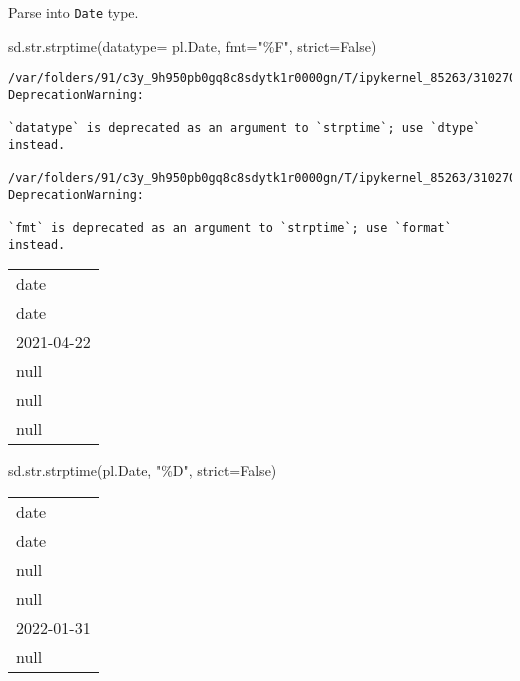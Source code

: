 \documentclass[
  letterpaper,
  DIV=11,
  numbers=noendperiod]{scrartcl}
\newenvironment{Shaded}{\begin{snugshade}}{\end{snugshade}}
\newcommand{\BuiltInTok}[1]{\textcolor[rgb]{0.00,0.23,0.31}{#1}}
\newcommand{\NormalTok}[1]{\textcolor[rgb]{0.00,0.23,0.31}{#1}}
\newcommand{\OperatorTok}[1]{\textcolor[rgb]{0.37,0.37,0.37}{#1}}
\newcommand{\SpecialCharTok}[1]{\textcolor[rgb]{0.37,0.37,0.37}{#1}}
\newcommand{\StringTok}[1]{\textcolor[rgb]{0.13,0.47,0.30}{#1}}
\newcommand{\VariableTok}[1]{\textcolor[rgb]{0.07,0.07,0.07}{#1}}
\begin{document}
Parse into \texttt{Date} type.

\begin{Shaded}
\begin{Highlighting}[]
\NormalTok{sd.}\BuiltInTok{str}\NormalTok{.strptime(datatype}\OperatorTok{=}\NormalTok{ pl.Date, fmt}\OperatorTok{=}\StringTok{"}\SpecialCharTok{\%F}\StringTok{"}\NormalTok{, strict}\OperatorTok{=}\VariableTok{False}\NormalTok{)}
\end{Highlighting}
\end{Shaded}

\begin{verbatim}
/var/folders/91/c3y_9h950pb0gq8c8sdytk1r0000gn/T/ipykernel_85263/3102708485.py:1: DeprecationWarning:

`datatype` is deprecated as an argument to `strptime`; use `dtype` instead.

/var/folders/91/c3y_9h950pb0gq8c8sdytk1r0000gn/T/ipykernel_85263/3102708485.py:1: DeprecationWarning:

`fmt` is deprecated as an argument to `strptime`; use `format` instead.
\end{verbatim}

\begin{longtable}[]{@{}l@{}}
\toprule()
date \\
date \\
\midrule()
\endhead
2021-04-22 \\
null \\
null \\
null \\
\bottomrule()
\end{longtable}

\begin{Shaded}
\begin{Highlighting}[]
\NormalTok{sd.}\BuiltInTok{str}\NormalTok{.strptime(pl.Date, }\StringTok{"\%D"}\NormalTok{, strict}\OperatorTok{=}\VariableTok{False}\NormalTok{)}
\end{Highlighting}
\end{Shaded}

\begin{longtable}[]{@{}l@{}}
\toprule()
date \\
date \\
\midrule()
\endhead
null \\
null \\
2022-01-31 \\
null \\
\bottomrule()
\end{longtable}
\end{document}
